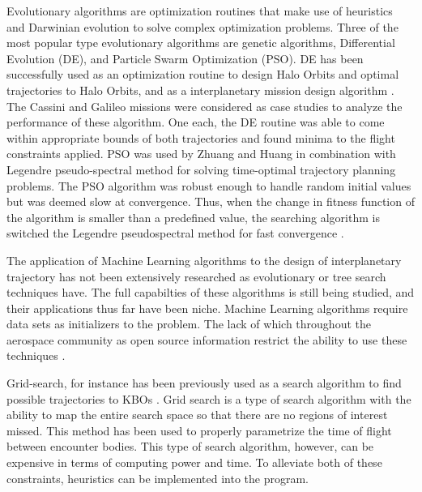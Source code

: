 \documentclass[letterpaper, preprint, paper,11pt]{AAS}	%
\begin{document}
Evolutionary algorithms are optimization routines that make use of heuristics and Darwinian evolution to solve complex optimization problems. Three of the most popular type evolutionary algorithms are genetic algorithms, Differential Evolution (DE), and Particle Swarm Optimization (PSO). DE has been successfully used as an optimization routine to design Halo Orbits and optimal trajectories to Halo Orbits, and as a interplanetary mission design algorithm \cite{Nath2016, Olds2007}.  The Cassini and Galileo missions were considered as case studies to analyze the performance of these algorithm. One each, the DE routine was able to come within appropriate bounds of both trajectories and found minima to the flight constraints applied. PSO was used by Zhuang and Huang in combination with Legendre pseudo-spectral method for solving time-optimal trajectory planning problems. The PSO algorithm was robust enough to handle random initial values but was deemed slow at convergence. Thus, when the change in fitness function of the algorithm is smaller than a predefined value, the searching algorithm is switched the Legendre pseudospectral method for fast convergence \cite{Zhuang2014}.  

The application of Machine Learning algorithms to the design of interplanetary trajectory has not been extensively researched as evolutionary or tree search techniques have. The full capabilties of these algorithms is still being studied, and their applications thus far have been niche. Machine Learning algorithms require data sets as initializers to the problem. The lack of which throughout the aerospace community as open source information restrict the ability to use these techniques \cite{Izzo2019}. 

Grid-search, for instance has been previously used as a search algorithm to find possible trajectories to KBOs \cite{Penas2019}. Grid search is a type of search algorithm with the ability to map the entire search space so that there are no regions of interest missed. This method has been used to properly parametrize the time of flight between encounter bodies. This type of search algorithm, however, can be expensive in terms of computing power and time. To alleviate both of these constraints, heuristics can be implemented into the program.  
\end{document}
